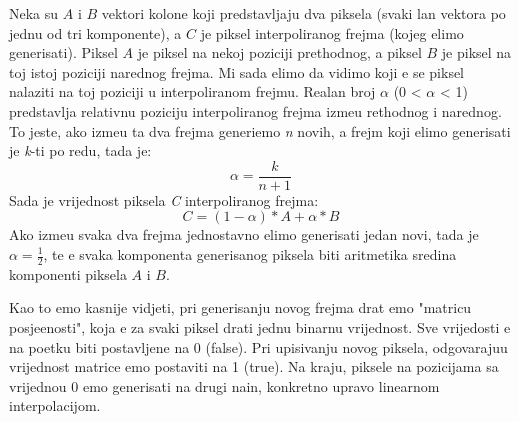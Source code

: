 Neka su $A$ i $B$ vektori kolone koji predstavljaju dva piksela (svaki \ch lan vektora po jednu od tri komponente), a $C$ je piksel interpoliranog frejma (kojeg \zh elimo generisati). Piksel $A$ je piksel na nekoj poziciji prethodnog, 
a piksel $B$ je piksel na toj istoj
poziciji narednog frejma. Mi sada \zh elimo da vidimo koji \cj e se piksel nalaziti na toj poziciji u interpoliranom frejmu. Realan broj $\alpha$ (0 < $\alpha$ < 1) predstavlja relativnu poziciju interpoliranog frejma izme\dj u
rethodnog i narednog. To jeste, ako izme\dj u ta dva frejma generi\sh emo \textit{n} novih, a frejm koji \zh elimo generisati je \textit{k}-ti po redu, tada je:
\begin{equation}
\alpha=\frac{k}{n+1}
\end{equation}
Sada je vrijednost piksela \textit{C} interpoliranog frejma:
\begin{equation}
C=(1-\alpha)*A+\alpha*B
\end{equation}
Ako izme\dj u svaka dva frejma jednostavno \zh elimo generisati jedan novi, tada je $\alpha=\frac{1}{2}$, te \cj e svaka komponenta generisanog piksela biti aritmeti\ch ka sredina komponenti piksela $A$ i $B$\cite{mefi}.

Kao \sh to \cj emo kasnije vidjeti, pri generisanju novog frejma dr\zh at \cj emo "matricu posje\cj enosti", koja \cj e za svaki piksel dr\zh ati jednu binarnu vrijednost. Sve vrijedosti \cj e na po\ch etku biti postavljene na 0 (false).
Pri upisivanju novog piksela, odgovaraju\cj u vrijednost matrice \cj emo postaviti na 1 (true). Na kraju, piksele na pozicijama sa vrijedno\sh \cj u 0 \cj emo generisati na drugi na\ch in, konkretno upravo linearnom interpolacijom.
